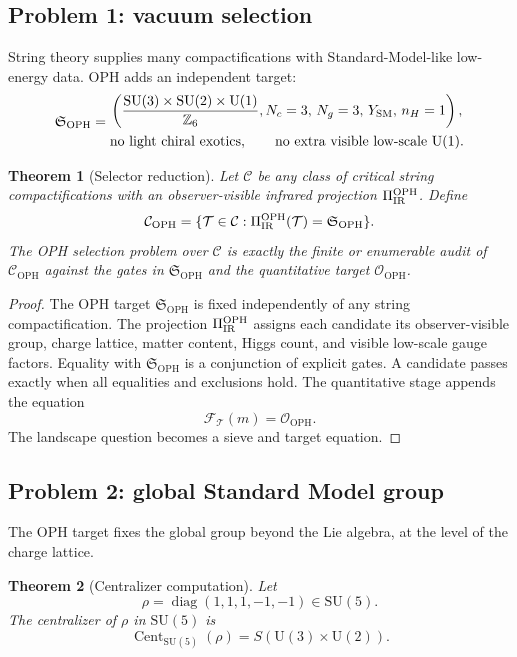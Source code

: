 \documentclass[11pt]{article}
\newtheorem{theorem}{Theorem}[section]
\theoremstyle{remark}
\theoremstyle{plain}
\newcommand{\OPH}{\mathrm{OPH}}
\newcommand{\SU}{\mathrm{SU}}
\newcommand{\U}{\mathrm{U}}
\newcommand{\Cent}{\operatorname{Cent}}
\newcommand{\diag}{\operatorname{diag}}
\newcommand{\Z}{\mathbb Z}
\newcommand{\calF}{\mathcal F}
\newcommand{\calO}{\mathcal O}
\begin{document}
\subsection{Problem 1: vacuum selection}

String theory supplies many compactifications with Standard-Model-like low-energy data. OPH
adds an independent target:
\[
\mathfrak S_{\OPH}=
\begin{gathered}
\left(
\frac{\SU(3)\times\SU(2)\times\U(1)}{\Z_6},
N_c=3,\,
N_g=3,\,
Y_{\rm SM},\,
n_H=1
\right),\\
\text{no light chiral exotics},\qquad
\text{no extra visible low-scale }\U(1).
\end{gathered}
\]

\begin{theorem}[Selector reduction]
Let \(\mathcal C\) be any class of critical string compactifications with an observer-visible
infrared projection \(\Pi_{\rm IR}^{\OPH}\). Define
\[
\mathcal C_{\OPH}=
\{\mathcal T\in\mathcal C:\Pi_{\rm IR}^{\OPH}(\mathcal T)=\mathfrak S_{\OPH}\}.
\]
The OPH selection problem over \(\mathcal C\) is exactly the finite or enumerable audit of
\(\mathcal C_{\OPH}\) against the gates in \(\mathfrak S_{\OPH}\) and the quantitative target
\(\calO_{\OPH}\).
\end{theorem}

\begin{proof}
The OPH target \(\mathfrak S_{\OPH}\) is fixed independently of any string compactification. The
projection \(\Pi_{\rm IR}^{\OPH}\) assigns each candidate its observer-visible group, charge
lattice, matter content, Higgs count, and visible low-scale gauge factors. Equality with
\(\mathfrak S_{\OPH}\) is a conjunction of explicit gates. A candidate passes exactly when all
equalities and exclusions hold. The quantitative stage appends the equation
\[
\calF_{\mathcal T}(m)=\calO_{\OPH}.
\]
The landscape question becomes a sieve and target equation.
\end{proof}

\subsection{Problem 2: global Standard Model group}

The OPH target fixes the global group beyond the Lie algebra, at the level of the charge lattice.

\begin{theorem}[Centralizer computation]
Let
\[
\rho=\diag(1,1,1,-1,-1)\in\SU(5).
\]
The centralizer of \(\rho\) in \(\SU(5)\) is
\[
\Cent_{\SU(5)}(\rho)=S(\U(3)\times\U(2)).
\]
\end{theorem}
\end{document}

